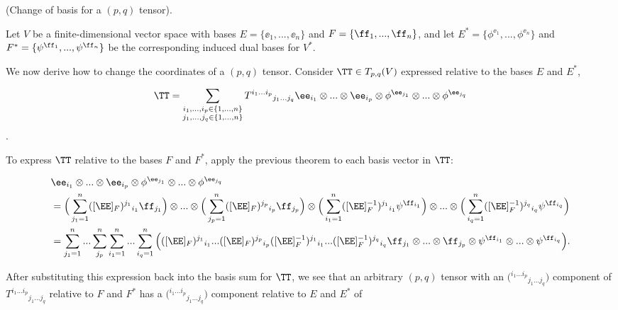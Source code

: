 \begin{theorem}
\label{ch::intro_to_tensors::thm::ricci}

    (Change of basis for a $(p, q)$ tensor). 
    
    Let $V$ be a finite-dimensional vector space with bases $E = \{\ee_1, ..., \ee_n\}$ and $F = \{\ff_1, ..., \ff_n\}$, and let $E^* = \{\phi^{\ee_1}, ..., \phi^{\ee_n}\}$ and $F^* = \{\psi^{\ff_1}, ..., \psi^{\ff_n}\}$ be the corresponding induced dual bases for $V^*$.
    
    We now derive how to change the coordinates of a $(p, q)$ tensor. Consider $\TT \in T_{p,q}(V)$ expressed relative to the bases $E$ and $E^*$,

    \begin{align*}
       \TT = \sum_{\substack{i_1, ..., i_p \in \{1, ..., n\} \\ j_1, ..., j_q \in \{1, ..., n\}}}
       T^{i_1 ... i_p}{}_{j_1 ... j_q} \ee_{i_1} \otimes ... \otimes \ee_{i_p} \otimes \phi^{\ee_{j_1}} \otimes ... \otimes \phi^{\ee_{j_q}}
    \end{align*}.
    
    To express $\TT$ relative to the bases $F$ and $F^*$, apply the previous theorem to each basis vector in $\TT$:
    
    \begin{align*}
        &\ee_{i_1} \otimes ... \otimes \ee_{i_p} \otimes \phi^{\ee_{j_1}} \otimes ... \otimes \phi^{\ee_{j_q}} \\
        &= \Big(\sum_{j_1 = 1}^n ([\EE]_F)^{j_1}{}_{i_1} \ff_{j_1} \Big) \otimes ... \otimes \Big(\sum_{j_p = 1}^n ([\EE]_F)^{j_p}{}_{i_p} \ff_{j_p} \Big)
        \otimes
        \Big( \sum_{i_1 = 1}^n ([\EE]_F^{-1})^{j_1}{}_{i_1} \psi^{\ff_{i_1}} \Big) \otimes
        ... \otimes \Big( \sum_{i_q = 1}^n ([\EE]_F^{-1})^{j_q}{}_{i_q} \psi^{\ff_{i_q}} \Big) \\
        &= \sum_{j_1 = 1}^n ... \sum_{j_p}^n \sum_{i_1 = 1}^n ... \sum_{i_q = 1}^n \Big( ([\EE]_F)^{j_1}{}_{i_1} ... ([\EE]_F)^{j_p}{}_{i_p}
        ([\EE]_F^{-1})^{j_1}{}_{i_1} ... ([\EE]_F^{-1})^{j_q}{}_{i_q} 
        \ff_{j_1} \otimes ... \otimes \ff_{j_p} \otimes \psi^{\ff_{i_1}} \otimes ... \otimes \psi^{\ff_{i_q}} \Big).
    \end{align*}
    
    After substituting this expression back into the basis sum for $\TT$, we see that an arbitrary $(p, q)$ tensor with an $\Big( {}^{i_1 ... i_p}{}_{j_1 ... j_q} \Big)$ component of $T^{i_1 ... i_p}{}_{j_1 ... j_q}$ relative to $F$ and $F^*$ has a $\Big( {}^{i_1 ... i_p}{}_{j_1 ... j_q} \Big)$ component relative to $E$ and $E^*$ of 
    

\end{theorem}
